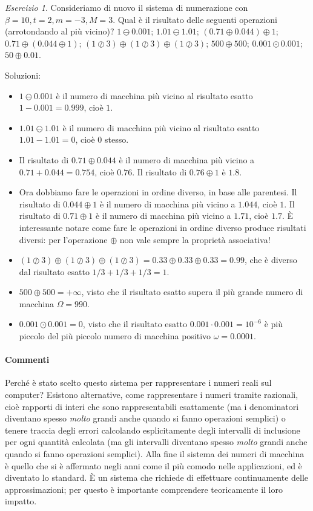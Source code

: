 \documentclass[a4paper]{report}
\theoremstyle{definiton}
\theoremstyle{remark}
\newtheorem{esercizio}[theorem]{Esercizio}
\begin{document}
\begin{esercizio} \label{ese: miscellanea numeri di macchina}
Consideriamo di nuovo il sistema di numerazione con $\beta=10, t=2, m=-3, M=3$. Qual è il risultato delle seguenti operazioni (arrotondando al più vicino)? $1 \ominus 0.001$; $1.01 \ominus 1.01$; $(0.71 \oplus 0.044) \oplus 1$; $0.71 \oplus (0.044 \oplus 1)$; $(1 \oslash 3) \oplus (1 \oslash 3) \oplus (1 \oslash 3)$; $500 \oplus 500$; $0.001 \odot 0.001$; $50 \oplus 0.01$.
\end{esercizio}
Soluzioni:
\begin{itemize}
    \item $1 \ominus 0.001$ è il numero di macchina più vicino al risultato esatto $1 - 0.001 = 0.999$, cioè $1$.
    \item $1.01 \ominus 1.01$ è il numero di macchina più vicino  al risultato esatto $1.01-1.01 = 0$, cioè $0$ stesso.
    \item Il risultato di $0.71 \oplus 0.044$ è il numero di macchina più vicino a $0.71+0.044 = 0.754$, cioè $0.76$. Il risultato di $ 0.76\oplus 1$ è $1.8$.
    \item Ora dobbiamo fare le operazioni in ordine diverso, in base alle parentesi. Il risultato di $0.044 \oplus 1$ è il numero di macchina più vicino a $1.044$, cioè $1$. Il risultato di $0.71\oplus 1$ è il numero di macchina più vicino a $1.71$, cioè $1.7$. È interessante notare come fare le operazioni in ordine diverso produce risultati diversi: per l'operazione $\oplus$ non vale sempre la proprietà associativa!
    \item $(1 \oslash 3) \oplus (1 \oslash 3) \oplus (1 \oslash 3) = 0.33 \oplus 0.33 \oplus 0.33 = 0.99$, che è diverso dal risultato esatto $1/3 + 1/3 + 1/3 = 1$.
    \item $500 \oplus 500 = +\infty$, visto che il risultato esatto supera il più grande numero di macchina $\Omega = 990$.
    \item $0.001 \odot 0.001 = 0$, visto che il risultato esatto $0.001 \cdot 0.001 = 10^{-6}$ è più piccolo del più piccolo numero di macchina positivo $\omega = 0.0001$.
\end{itemize}



\paragraph{Commenti} Perché è stato scelto questo sistema per rappresentare i numeri reali sul computer? Esistono alternative, come rappresentare i numeri tramite razionali, cioè rapporti di interi che sono rappresentabili esattamente (ma i denominatori diventano spesso \emph{molto} grandi anche quando si fanno operazioni semplici) o tenere traccia degli errori calcolando esplicitamente degli intervalli di inclusione per ogni quantità calcolata (ma gli intervalli diventano spesso \emph{molto} grandi anche quando si fanno operazioni semplici). Alla fine il sistema dei numeri di macchina è quello che si è affermato negli anni come il più comodo nelle applicazioni, ed è diventato lo standard. È un sistema che richiede di effettuare continuamente delle approssimazioni; per questo è importante comprendere teoricamente il loro impatto.
\end{document}
